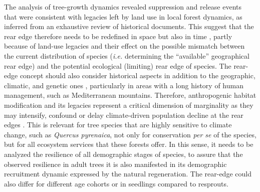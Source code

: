 The analysis of tree-growth dynamics revealed suppression and release events that were consistent with legacies left by land use in local forest dynamics, as inferred from an exhaustive review of historical documents. This suggest that the rear edge therefore needs to be redefined in space but also in time \autocite{VilaCabreraetal2019RefiningPredictions}, partly because of land-use legacies and their effect on the possible mismatch between the current distribution of species (\emph{i.e.} determining the ``available'' geographical rear edge) and the potential ecological (limiting) rear edge of species. The rear-edge concept should also consider historical aspects in addition to the geographic, climatic, and genetic ones \autocite{VilaCabreraetal2019RefiningPredictions}, particularly in areas with a long history of human management, such as Mediterranean mountains. Therefore, anthropogenic habitat modification and its legacies represent a critical dimension of marginality as they may intensify, confound or delay climate-driven population decline at the rear edges \autocite{VilaCabreraetal2019RefiningPredictions}. This is relevant for tree species that are highly sensitive to climate change, such as \emph{Quercus pyrenaica}, not only for conservation \emph{per se} of the species, but for all ecosystem services that these forests offer. In this sense, it needs to be analyzed the resilience of all demographic stages of species, to assure that the observed resilience in adult trees it is also manifested in its demographic recruitment dynamic expressed by the natural regeneration. The rear-edge could also differ for different age cohorts or in seedlings compared to resprouts.
